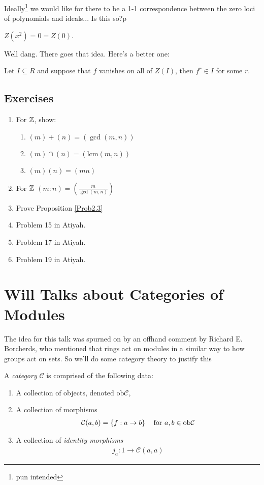 \documentclass[12pt, twosided]{article}
\begin{document}
Ideally\footnote{pun intended} we would like for there to be a 1-1 correspondence between the zero loci of polynomials and ideals... Is this so?p

\begin{exa}
  \(Z(x^2) = 0 = Z(0)\).
\end{exa}

Well dang. There goes that idea. Here's a better one:

\begin{thm}
  Let \(I \subseteq R\) and suppose that \(f\) vanishes on all of \(Z(I)\), then \(f^r \in I\) for some \(r\).
\end{thm}

\subsection{Exercises}
\begin{enumerate}
\item For \(\mathbb{Z}\), show:
  \begin{enumerate}
  \item \((m) + (n) = (\gcd(m,n))\)
  \item \((m) \cap (n) = (\mathrm{lcm}(m, n))\)
  \item \((m)(n) = (mn)\)
  \end{enumerate}
\item For \(\mathbb{Z}\) \((m:n) = \left(\frac{m}{\gcd(m,n)}\right)\)
\item Prove Proposition \ref{Prob2.3}
\item Problem 15 in Atiyah.
\item Problem 17 in Atiyah.
\item Problem 19 in Atiyah.
\end{enumerate}
\section{Will Talks about Categories of Modules}

The idea for this talk was spurned on by an offhand comment by Richard E. Borcherds, who mentioned that rings act on modules in a similar way to how groups act on sets. So we'll do some category theory to justify this

\begin{df}
  A \textit{category} \(\mathcal{C}\) is comprised of the following data:
  \begin{enumerate}
  \item A collection of objects, denoted \(\mathrm{ob} \mathcal{C}\), 
  \item A collection of morphisms
    \begin{align*}
      \mathcal{C}(a, b) = \left\{ f: a \to b \right\} \quad \text{for } a, b \in \mathrm{ob} \mathcal{C}
    \end{align*}
  \item A collection of \textit{identity morphisms}
    \begin{align*}
      j_a: 1 \to \mathcal{C}(a,a)
    \end{align*}
  \end{enumerate}
\end{df}
\end{document}
